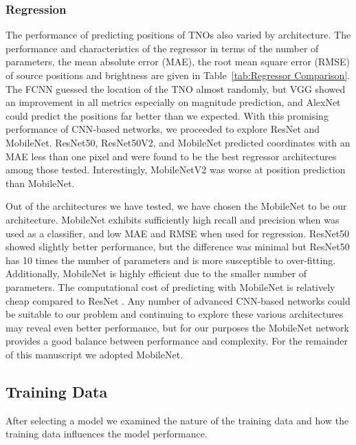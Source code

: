 \documentclass{aastex631}
\begin{document}
\subsubsection{Regression} \label{subsubsect:FixedDataRgs}

The performance of predicting positions of TNOs also varied by architecture.
The performance and characteristics of the regressor in terms of the number of parameters, the mean absolute error (MAE), the root mean square error (RMSE) of source positions and brightness are given in Table~\ref{tab:Regressor Comparison}.
The FCNN guessed the location of the TNO almost randomly, but VGG showed an improvement in all metrics especially on magnitude prediction, and AlexNet could predict the positions far better than we expected.
With this promising performance of CNN-based networks, we proceeded to explore ResNet and MobileNet.
ResNet50, ResNet50V2, and MobileNet predicted coordinates with an MAE less than one pixel and were found to be the best regressor architectures among those tested.
Interestingly, MobileNetV2 was worse at position prediction than MobileNet.

Out of the architectures we have tested, we have chosen the MobileNet to be our architecture. 
MobileNet exhibits sufficiently high recall and precision when was used as a classifier, and low MAE and RMSE when used for regression. 
ResNet50 showed slightly better performance, but the difference was minimal but ResNet50 has 10 times the number of parameters and is more susceptible to over-fitting.
Additionally, MobileNet is highly efficient due to the smaller number of parameters.
The computational cost of predicting with MobileNet is relatively cheap compared to ResNet \citep{2020arXiv201108367S}.
Any number of advanced CNN-based networks could be suitable to our problem and continuing to explore these various architectures may reveal even better performance, but for our purposes the MobileNet network provides a good balance between performance and complexity.
For the remainder of this manuscript we adopted MobileNet. 

 \subsection{Training Data}
 \label{subsect:FixedArch}
 
After selecting a model we examined the nature of the training data and how the training data influences the model performance.
\end{document}
